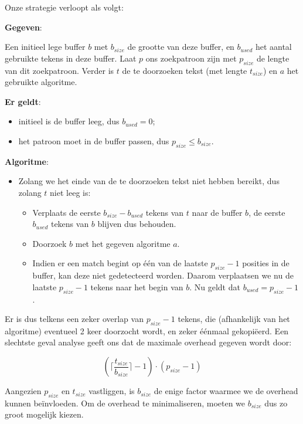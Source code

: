 \documentclass[a4paper,11pt]{article}
\begin{document}
Onze strategie verloopt als volgt:

\textbf{Gegeven}:

Een initieel lege buffer $b$ met $b_{size}$ de grootte van deze buffer, en
$b_{used}$ het aantal gebruikte tekens in deze buffer. Laat $p$ ons zoekpatroon
zijn met $p_{size}$ de lengte van dit zoekpatroon. Verder is $t$ de te
doorzoeken tekst (met lengte $t_{size}$) en $a$ het gebruikte algoritme.

\textbf{Er geldt}:

\begin{itemize}
    \item initieel is de buffer leeg, dus $b_{used} = 0$;
    \item het patroon moet in de buffer passen, dus $p_{size} \leq b_{size}$.
\end{itemize}

\textbf{Algoritme}:

\begin{itemize}
    \item Zolang we het einde van de te doorzoeken tekst niet hebben bereikt,
    dus zolang $t$ niet leeg is:
    \begin{itemize}
        \item Verplaats de eerste $b_{size} - b_{used}$ tekens van $t$ naar de
        buffer $b$, de eerste $b_{used}$ tekens van $b$ blijven dus behouden.
        \item Doorzoek $b$ met het gegeven algoritme $a$.
        \item Indien er een match begint op \'e\'en van de
        laatste $p_{size} - 1$ posities in de buffer, kan deze niet gedetecteerd
        worden. Daarom verplaatsen we nu de laatste $p_{size} - 1$ tekens naar
        het begin van $b$. Nu geldt dat $b_{used} = p_{size} - 1$.
    \end{itemize}
\end{itemize}

Er is dus telkens een zeker overlap van $p_{size} - 1$ tekens, die (afhankelijk
van het algoritme) eventueel 2 keer doorzocht wordt, en zeker \'e\'enmaal
gekopi\"eerd. Een slechtste geval analyse geeft ons dat de maximale overhead
gegeven wordt door:

\begin{equation*}
\left( \lceil \frac{t_{size}}{b_{size}} \rceil - 1 \right)
    \cdot \left( p_{size} - 1 \right)
\end{equation*}

Aangezien $p_{size}$ en $t_{size}$ vastliggen, is $b_{size}$ de enige factor
waarmee we de overhead kunnen be\"invloeden. Om de overhead te minimaliseren,
moeten we $b_{size}$ dus zo groot mogelijk kiezen.
\end{document}
